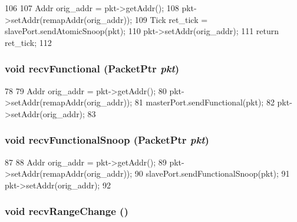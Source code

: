\begin{DoxyCode}
106 {
107     Addr orig_addr = pkt->getAddr();
108     pkt->setAddr(remapAddr(orig_addr));
109     Tick ret_tick = slavePort.sendAtomicSnoop(pkt);
110     pkt->setAddr(orig_addr);
111     return ret_tick;
112 }
\end{DoxyCode}
\hypertarget{classAddrMapper_aeefa907fb6d6a787e6dab90e8138ea90}{
\subsubsection[{recvFunctional}]{\setlength{\rightskip}{0pt plus 5cm}void recvFunctional ({\bf PacketPtr} {\em pkt})}}
\label{classAddrMapper_aeefa907fb6d6a787e6dab90e8138ea90}



\begin{DoxyCode}
78 {
79     Addr orig_addr = pkt->getAddr();
80     pkt->setAddr(remapAddr(orig_addr));
81     masterPort.sendFunctional(pkt);
82     pkt->setAddr(orig_addr);
83 }
\end{DoxyCode}
\hypertarget{classAddrMapper_a284dfb90c168233c9d416bc07de8fefe}{
\subsubsection[{recvFunctionalSnoop}]{\setlength{\rightskip}{0pt plus 5cm}void recvFunctionalSnoop ({\bf PacketPtr} {\em pkt})}}
\label{classAddrMapper_a284dfb90c168233c9d416bc07de8fefe}



\begin{DoxyCode}
87 {
88     Addr orig_addr = pkt->getAddr();
89     pkt->setAddr(remapAddr(orig_addr));
90     slavePort.sendFunctionalSnoop(pkt);
91     pkt->setAddr(orig_addr);
92 }
\end{DoxyCode}
\hypertarget{classAddrMapper_aecf310a01b533ae8700eccac2cf20480}{
\subsubsection[{recvRangeChange}]{\setlength{\rightskip}{0pt plus 5cm}void recvRangeChange ()}}
\label{classAddrMapper_aecf310a01b533ae8700eccac2cf20480}




